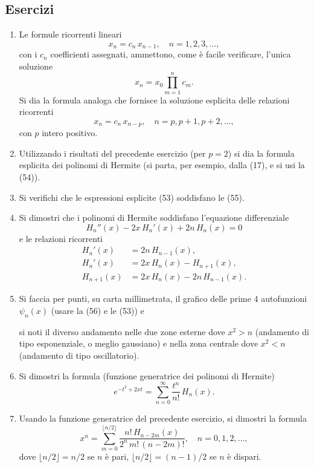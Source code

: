 \documentclass[11pt, a4paper]{book}
\numberwithin{equation}{section}
\newenvironment{esercizi}{\subsection*{Esercizi}\begin{enumerate}}{\end{enumerate}}
\begin{document}
\begin{esercizi}

\item Le formule ricorrenti lineari
\[
x_n = c_n\,x_{n-1}, \quad n = 1, 2, 3, \ldots,
\]
con i $c_n$ coefficienti assegnati, ammettono, come è facile verificare,
l'unica soluzione
\[
x_n = x_0\prod_{m=1}^{n} c_m.
\]
Si dia la formula analoga che fornisce la soluzione esplicita delle
relazioni ricorrenti
\[
x_n = c_n\,x_{n-p}, \quad n = p, p+1, p+2, \ldots,
\]
con $p$ intero positivo.

\item Utilizzando i risultati del precedente esercizio (per $p=2$) si
dia la formula esplicita dei polinomi di Hermite (si parta, per esempio,
dalla (17), e si usi la (54)).

\item Si verifichi che le espressioni esplicite (53) soddisfano le (55).

\item Si dimostri che i polinomi di Hermite soddisfano l'equazione
differenziale
\[
H_n''(x) - 2x\,H_n'(x) + 2n\,H_n(x) = 0
\]
e le relazioni ricorrenti
\begin{align*}
H_n'(x) &= 2n\,H_{n-1}(x), \\
H_n'(x) &= 2x\,H_n(x) - H_{n+1}(x), \\
H_{n+1}(x) &= 2x\,H_n(x) - 2n\,H_{n-1}(x).
\end{align*}

\item Si faccia per punti, su carta millimetrata, il grafico delle prime
4 autofunzioni $\psi_n(x)$ (usare la (56) e le (53)) e


si noti il diverso andamento nelle due zone esterne dove $x^2 > n$
(andamento di tipo esponenziale, o meglio gaussiano) e nella zona
centrale dove $x^2 < n$ (andamento di tipo oscillatorio).

\item Si dimostri la formula (funzione generatrice dei polinomi di
Hermite)
\[
e^{-t^2+2xt} = \sum_{n=0}^{\infty} \frac{t^n}{n!}\,H_n(x).
\]

\item[*] Usando la funzione generatrice del precedente esercizio, si
dimostri la formula
\[
x^n = \sum_{m=0}^{\lfloor n/2\rfloor}
\frac{n!\,H_{n-2m}(x)}{2^n\,m!\,(n-2m)!}, \quad n = 0,1,2,\ldots,
\]
dove $\lfloor n/2\rfloor = n/2$ se $n$ è pari, $\lfloor n/2\rfloor =
(n-1)/2$ se $n$ è dispari.


\end{esercizi}
\end{document}

